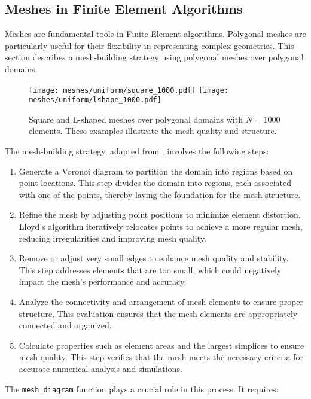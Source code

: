 \subsection{Meshes in Finite Element Algorithms}

Meshes are fundamental tools in Finite Element algorithms. Polygonal meshes are particularly useful for their flexibility in representing complex geometries. This section describes a mesh-building strategy using polygonal meshes over polygonal domains.

\begin{figure}[!ht]
    \centering
    \texttt{[image: meshes/uniform/square\_1000.pdf]}
    \texttt{[image: meshes/uniform/lshape\_1000.pdf]}
    \caption{Square and L-shaped meshes over polygonal domains with $N = 1000$ elements. These examples illustrate the mesh quality and structure.}
\end{figure}

The mesh-building strategy, adapted from \cite{Talischi2012}, involves the following steps:

\begin{enumerate}
    \item Generate a Voronoi diagram to partition the domain into regions based on point locations. This step divides the domain into regions, each associated with one of the points, thereby laying the foundation for the mesh structure.
    \item Refine the mesh by adjusting point positions to minimize element distortion. Lloyd's algorithm iteratively relocates points to achieve a more regular mesh, reducing irregularities and improving mesh quality.
    \item Remove or adjust very small edges to enhance mesh quality and stability. This step addresses elements that are too small, which could negatively impact the mesh's performance and accuracy.
    \item Analyze the connectivity and arrangement of mesh elements to ensure proper structure. This evaluation ensures that the mesh elements are appropriately connected and organized.
    \item Calculate properties such as element areas and the largest simplices to ensure mesh quality. This step verifies that the mesh meets the necessary criteria for accurate numerical analysis and simulations.
\end{enumerate}

The \lstinline{mesh_diagram} function plays a crucial role in this process. It requires:

